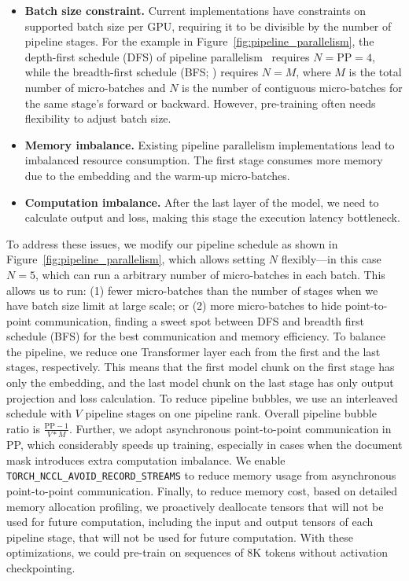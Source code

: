 \documentclass[dvipsnames]{fairmeta}
\begin{document}
\begin{itemize}
    \item \textbf{Batch size constraint.} Current implementations have constraints on supported batch size per GPU, requiring it to be divisible by the number of pipeline stages. For the example in Figure~\ref{fig:pipeline_parallelism}, the depth-first schedule (DFS) of pipeline parallelism~\citep{narayanan2021efficient} requires $N=\textrm{PP}=4$, while the breadth-first schedule (BFS; \citet{lamy2023breadth}) requires $N=M$, where $M$ is the total number of micro-batches and $N$ is the number of contiguous micro-batches for the same stage's forward or backward. However, pre-training often needs flexibility to adjust batch size.
    
    \item \textbf{Memory imbalance.} Existing pipeline parallelism implementations lead to imbalanced resource consumption. The first stage consumes more memory due to the embedding and the warm-up micro-batches.
    
    \item \textbf{Computation imbalance.} After the last layer of the model, we need to calculate output and loss, making this stage the execution latency bottleneck.
\end{itemize} 

To address these issues, we modify our pipeline schedule as shown in Figure~\ref{fig:pipeline_parallelism}, which allows setting $N$ flexibly---in this case $N=5$, which can run a arbitrary number of micro-batches in each batch. This allows us to run: (1) fewer micro-batches than the number of stages when we have batch size limit at large scale; or (2) more micro-batches to hide point-to-point communication, finding a sweet spot between DFS and breadth first schedule (BFS) for the best communication and memory efficiency. To balance the pipeline, we reduce one Transformer layer each from the first and the last stages, respectively. This means that the first model chunk on the first stage has only the embedding, and the last model chunk on the last stage has only output projection and loss calculation. To reduce pipeline bubbles, we use an interleaved schedule \citep{narayanan2021efficient} with $V$ pipeline stages on one pipeline rank. Overall pipeline bubble ratio is $\frac{\textrm{PP} - 1}{V * M}$. Further, we adopt asynchronous point-to-point communication in PP, which considerably speeds up training, especially in cases when the document mask introduces extra computation imbalance. We enable {\small \texttt{TORCH\_NCCL\_AVOID\_RECORD\_STREAMS}} to reduce memory usage from asynchronous point-to-point communication. Finally, to reduce memory cost, based on detailed memory allocation profiling, we proactively deallocate tensors that will not be used for future computation, including the input and output tensors of each pipeline stage, that will not be used for future computation. With these optimizations, we could pre-train \llamathree on sequences of 8K tokens without activation checkpointing.
\end{document}
